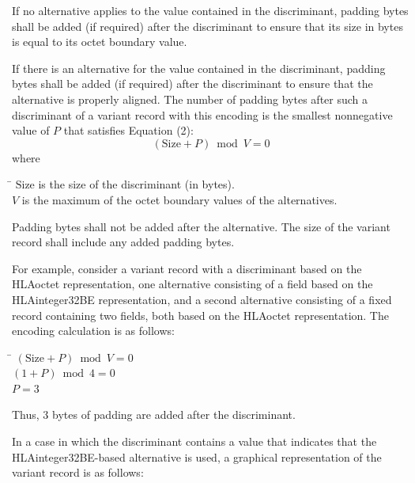 If no alternative applies to the value contained in the discriminant, padding bytes shall be added (if required) after the discriminant to ensure that its size in bytes is equal to its octet boundary value.

If there is an alternative for the value contained in the discriminant, padding bytes shall be added (if required) after the discriminant to ensure that the alternative is properly aligned. The number of padding bytes after such a discriminant of a variant record with this encoding is the smallest nonnegative value of $P$ that satisfies Equation (2):
\begin{equation}
    (\mathrm{Size} + P) \bmod V = 0
\end{equation}
where

\newpage
\begin{tabbing}
    \hspace{30pt}\=\kill
    $\mathrm{Size}$ \> is the size of the discriminant (in bytes).\\
    $V$ \> is the maximum of the octet boundary values of the alternatives.
\end{tabbing}

Padding bytes shall not be added after the alternative. The size of the variant record shall include any added padding bytes.

For example, consider a variant record with a discriminant based on the HLAoctet representation, one alternative consisting of a field based on the HLAinteger32BE representation, and a second alternative consisting of a fixed record containing two fields, both based on the HLAoctet representation. The encoding calculation is as follows:

\begin{tabbing}
    \hspace{18pt}\=\kill
    \> $(\mathrm{Size}+P) \bmod V = 0$\\
    \> $(1+P) \bmod 4 = 0$\\
    \> $P=3$
\end{tabbing}

Thus, 3 bytes of padding are added after the discriminant.

In a case in which the discriminant contains a value that indicates that the HLAinteger32BE-based alternative is used, a graphical representation of the variant record is as follows:

